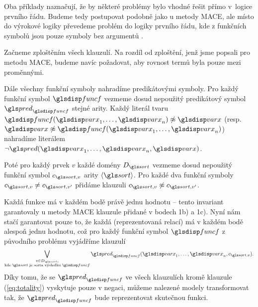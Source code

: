 
Oba příklady naznačují, že by některé problémy bylo vhodné řešit
přímo v~logice prvního řádu. Budeme tedy postupovat podobně
jako u metody MACE, ale místo do výrokové logiky převedeme
problém do logiky prvního řádu, kde z funkčních symbolů
jsou pouze symboly bez argumentů \cite{fmdarwin}.

Začneme zploštěním všech klauzulí. Na rozdíl od zploštění,
jenž jsme popsali pro metodu MACE, budeme navíc požadovat, aby
rovnost termů byla pouze mezi proměnnými.

Dále všechny funkční symboly nahradíme predikátovými symboly.
Pro každý funkční symbol $\func$
vezmeme dosud nepoužitý predikátový symbol
$\pred_\func$ stejné arity. Každý literál tvaru
$\func(\var_1 \comdots \var_n) \not\approx \var$
(resp. $\var \not\approx \func(\var_1 \comdots \var_n)$)
nahradíme literálem $\neg \pred(\var_1 \comdots \var_n, \var)$.


Poté pro každý prvek $v$ každé domény $D_\sort$ vezmeme
dosud nepoužitý funkční symbol $c_{\sort, v}$ arity $\langle \sort \rangle$.
Pro každé dva funkční symboly $c_{\sort, v} \neq c_{\sort, v'}$
přidáme klauzuli $c_{\sort, v} \not\approx c_{\sort, v'}$.


Každá funkce má v každém bodě právě jednu hodnotu -- tento
invariant garantovaly u metody MACE klauzule přidané v bodech 1b) a 1c).
Nyní nám stačí garantovat pouze to, že každá 
(reprezentovaná relací) má v každém bodě alespoň jednu hodnotu,
což pro každý funkční symbol $\func$ z původního problému vyjádříme klauzulí
\begin{equation} \label{eq:totality}
  \bigvee_{\substack{v \in D_\sort, \\ \text{kde $\sort$ je sorta výsledku $\func$}}}
    \pred_\func(\var_1 \comdots \var_n, c_{\sort, v}).
\end{equation}
Díky tomu, že se $\pred_\func$ ve všech klauzulích kromě
klauzule (\ref{eq:totality}) vyskytuje pouze v negaci,
můžeme nalezené modely transformovat tak, že $\pred_\func$
bude reprezentovat skutečnou funkci.

